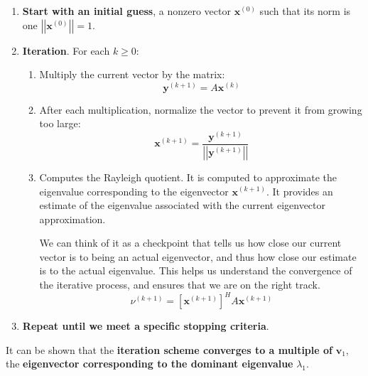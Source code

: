 \begin{enumerate}
    \item \textbf{Start with an initial guess}, a nonzero vector $\mathbf{x}^{\left(0\right)}$ such that its norm is one $\left|\left|\mathbf{x}^{\left(0\right)}\right|\right| = 1$.
    \item \textbf{Iteration}. For each $k \ge 0$:
    \begin{enumerate}
        \item Multiply the current vector by the matrix:
        \begin{equation*}
            \mathbf{y}^{\left(k+1\right)} = A\mathbf{x}^{\left(k\right)}
        \end{equation*}

        \item After each multiplication, normalize the vector to prevent it from growing too large:
        \begin{equation*}
            \mathbf{x}^{\left(k+1\right)} = \dfrac{
                \mathbf{y}^{\left(k+1\right)}
            }{
                \left|\left|\mathbf{y}^{\left(k+1\right)}\right|\right|
            }
        \end{equation*}

        \label{eq: Rayleigh quotient}
        \item Computes the Rayleigh quotient. It is computed to approximate the eigenvalue corresponding to the eigenvector $\mathbf{x}^{\left(k+1\right)}$. It provides an estimate of the eigenvalue associated with the current eigenvector approximation.
        
        We can think of it as a checkpoint that tells us how close our current vector is to being an actual eigenvector, and thus how close our estimate is to the actual eigenvalue. This helps us understand the convergence of the iterative process, and ensures that we are on the right track.
        \begin{equation*}
            \nu^{\left(k+1\right)} = \left[\mathbf{x}^{\left(k+1\right)}\right]^{H} A\mathbf{x}^{\left(k+1\right)}
        \end{equation*}
    \end{enumerate}
    \item \textbf{Repeat until we meet a specific stopping criteria}.
\end{enumerate}
It can be shown that the \textbf{iteration scheme converges to a multiple of} $\mathbf{v}_{1}$, the \textbf{eigenvector corresponding to the dominant eigenvalue} $\lambda_{1}$.

